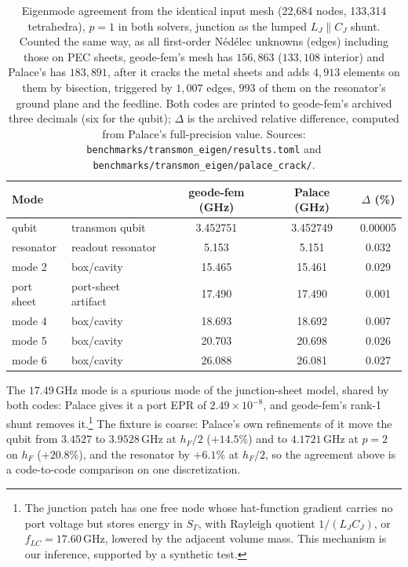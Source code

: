 \documentclass{anvil-paper}
\begin{document}
\begin{table}[htbp]
  \centering
  \caption{Eigenmode agreement from the identical input mesh (22{,}684
  nodes, 133{,}314 tetrahedra), $p = 1$ in both solvers, junction as
  the lumped $L_J \parallel C_J$ shunt. Counted the same way, as all
  first-order N\'ed\'elec unknowns (edges) including those on PEC sheets,
  geode-fem's mesh has $156{,}863$ ($133{,}108$ interior) and Palace's has
  $183{,}891$, after it cracks the metal sheets and adds $4{,}913$ elements
  on them by bisection, triggered by $1{,}007$ edges, $993$ of them on
  the resonator's ground plane and the feedline. Both
  codes are printed to geode-fem's archived three decimals (six for the
  qubit); $\Delta$ is the archived relative difference, computed from
  Palace's full-precision value. Sources:
  \texttt{benchmarks/transmon\_eigen/results.toml} and
  \texttt{benchmarks/transmon\_eigen/palace\_crack/}.}
  \label{tab:agreement}
  \footnotesize
  \begin{tabular}{@{}llccc@{}}
    \toprule
    Mode & & geode-fem (GHz) & Palace (GHz) & $\Delta$ (\%) \\
    \midrule
    qubit & transmon qubit & 3.452751 & 3.452749 & 0.00005 \\
    resonator & readout resonator & 5.153 & 5.151 & 0.032 \\
    mode 2 & box/cavity & 15.465 & 15.461 & 0.029 \\
    port sheet & port-sheet artifact & 17.490 & 17.490 & 0.001 \\
    mode 4 & box/cavity & 18.693 & 18.692 & 0.007 \\
    mode 5 & box/cavity & 20.703 & 20.698 & 0.026 \\
    mode 6 & box/cavity & 26.088 & 26.081 & 0.027 \\
    \bottomrule
  \end{tabular}
\end{table}

The $17.49$\,GHz mode is a spurious mode of the junction-sheet model,
shared by both codes: Palace gives it a port EPR of $2.49\times10^{-8}$,
and geode-fem's rank-1 shunt removes it.\footnote{The junction patch has
one free node whose hat-function gradient carries no port voltage but
stores energy in $S_\Gamma$, with Rayleigh quotient $1/(L_JC_J)$, or
$f_{LC} = 17.60$\,GHz, lowered by the adjacent volume mass. This
mechanism is our inference, supported by a synthetic test.} The fixture
is coarse: Palace's own refinements of it move the qubit from
$3.4527$ to $3.9528$\,GHz at $h_F/2$ ($+14.5\%$) and to $4.1721$\,GHz at
$p = 2$ on $h_F$ ($+20.8\%$), and the resonator by $+6.1\%$ at $h_F/2$, so
the agreement above is a code-to-code comparison on one discretization.
\end{document}
